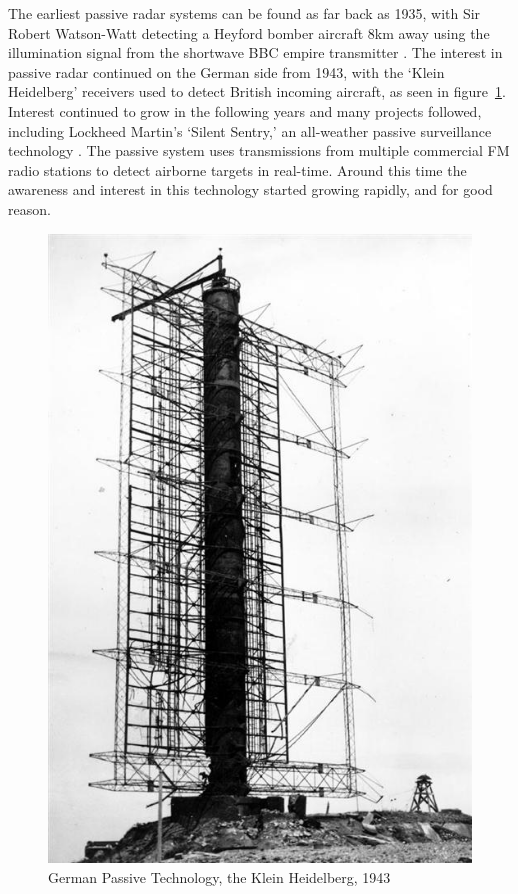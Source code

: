 \documentclass[12pt,openany,a4paper]{book}
\begin{document}
\bigskip

The earliest passive radar systems can be found as far back as 1935, with Sir Robert Watson-Watt detecting a Heyford bomber aircraft 8km away using the illumination signal from the shortwave BBC empire transmitter \cite{HK5, HK6}. The interest in passive radar continued on the German side from 1943, with the ‘Klein Heidelberg’ receivers used to detect British incoming aircraft, as seen in figure~\ref{KH}. Interest continued to grow in the following years and many projects followed, including Lockheed Martin’s ‘Silent Sentry,’ an all-weather passive surveillance technology \cite{LHM}. The passive system uses transmissions from multiple commercial FM radio stations to detect airborne targets in real-time. Around this time the awareness and interest in this technology started growing rapidly, and for good reason.

\bigskip

\begin{figure}[htbp]
\centerline{\includegraphics{KHTF.jpg}}
\caption{German Passive Technology, the Klein Heidelberg, 1943 \cite{pic1}}
\label{KH}
\end{figure}
\end{document}
